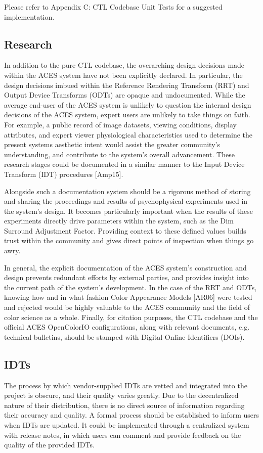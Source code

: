 \documentclass[conference]{IEEEtran}
\begin{document}
Please refer to Appendix C: CTL Codebase Unit Tests for a suggested implementation.

\subsection{Research}
In addition to the pure CTL codebase, the overarching design decisions made within the ACES system have not been explicitly declared. In particular, the design decisions imbued within the Reference Rendering Transform (RRT) and Output Device Transforms (ODTs) are opaque and undocumented. While the average end-user of the ACES system is unlikely to question the internal design decisions of the ACES system, expert users are unlikely to take things on faith. For example, a public record of image datasets, viewing conditions, display attributes, and expert viewer physiological characteristics used to determine the present systems aesthetic intent would assist the greater community's understanding, and contribute to the system's overall advancement. These research stages could be documented in a similar manner to the Input Device Transform (IDT) procedures [Amp15].

Alongside such a documentation system should be a rigorous method of storing and sharing the proceedings and results of psychophysical experiments used in the system's design. It becomes particularly important when the results of these experiments directly drive parameters within the system, such as the Dim Surround Adjustment Factor. Providing context to these defined values builds trust within the community and gives direct points of inspection when things go awry.

In general, the explicit documentation of the ACES system's construction and design prevents redundant efforts by external parties, and provides insight into the current path of the system's development. In the case of the RRT and ODTs, knowing how and in what fashion Color Appearance Models [AR06] were tested and rejected would be highly valuable to the ACES community and the field of color science as a whole. Finally, for citation purposes, the CTL codebase and the official ACES OpenColorIO configurations, along with relevant documents, e.g. technical bulletins, should be stamped with Digital Online Identifiers (DOIs).

\subsection{IDTs}
The process by which vendor-supplied IDTs are vetted and integrated into the project is obscure, and their quality varies greatly. Due to the decentralized nature of their distribution, there is no direct source of information regarding their accuracy and quality. A formal process should be established to inform users when IDTs are updated. It could be implemented through a centralized system with release notes, in which users can comment and provide feedback on the quality of the provided IDTs.
\end{document}
